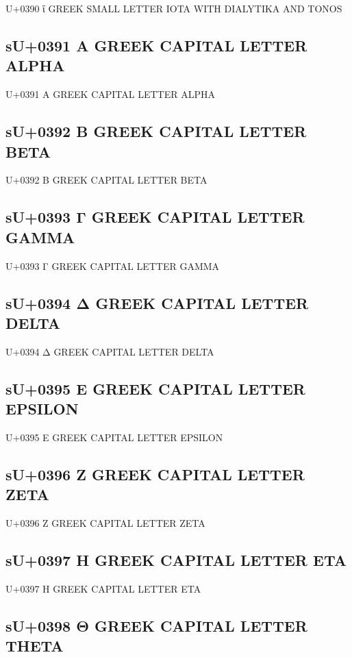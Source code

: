 U+0390 ΐ GREEK SMALL LETTER IOTA WITH DIALYTIKA AND TONOS

\subsection{sU+0391 Α GREEK CAPITAL LETTER ALPHA}

U+0391 Α GREEK CAPITAL LETTER ALPHA

\subsection{sU+0392 Β GREEK CAPITAL LETTER BETA}

U+0392 Β GREEK CAPITAL LETTER BETA

\subsection{sU+0393 Γ GREEK CAPITAL LETTER GAMMA}

U+0393 Γ GREEK CAPITAL LETTER GAMMA

\subsection{sU+0394 Δ GREEK CAPITAL LETTER DELTA}

U+0394 Δ GREEK CAPITAL LETTER DELTA

\subsection{sU+0395 Ε GREEK CAPITAL LETTER EPSILON}

U+0395 Ε GREEK CAPITAL LETTER EPSILON

\subsection{sU+0396 Ζ GREEK CAPITAL LETTER ZETA}

U+0396 Ζ GREEK CAPITAL LETTER ZETA

\subsection{sU+0397 Η GREEK CAPITAL LETTER ETA}

U+0397 Η GREEK CAPITAL LETTER ETA

\subsection{sU+0398 Θ GREEK CAPITAL LETTER THETA}

